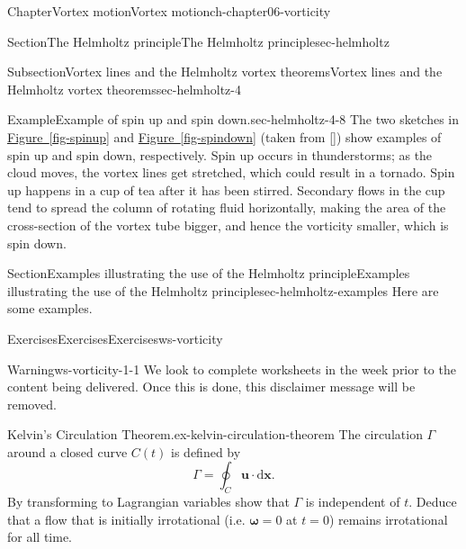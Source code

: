 \documentclass[oneside,10pt,]{book}
\newcommand{\xreffont}{\relax}
\numberwithin{equation}{section}
\newcommand{\de}{\mathrm{d}}
\newcommand{\bomega}{\boldsymbol{\omega}}
\begin{document}
\begin{chapterptx}{Chapter}{Vortex motion}{}{Vortex motion}{}{}{ch-chapter06-vorticity}
\begin{sectionptx}{Section}{The Helmholtz principle}{}{The Helmholtz principle}{}{}{sec-helmholtz}
\begin{subsectionptx}{Subsection}{Vortex lines and the Helmholtz vortex theorems}{}{Vortex lines and the Helmholtz vortex theorems}{}{}{sec-helmholtz-4}
\begin{example}{Example}{Example of spin up and spin down.}{sec-helmholtz-4-8}
The two sketches in \hyperref[fig-spinup]{Figure~{\xreffont\ref{fig-spinup}}} and \hyperref[fig-spindown]{Figure~{\xreffont\ref{fig-spindown}}} (taken from \hyperlink{ref-acheson}{[{\xreffont 4}]}) show examples of spin up and spin down, respectively. Spin up occurs in thunderstorms; as the cloud moves, the vortex lines get stretched, which could result in a tornado. Spin up happens in a cup of tea after it has been stirred. Secondary flows in the cup tend to spread the column of rotating fluid horizontally, making the area of the cross-section of the vortex tube bigger, and hence the vorticity smaller, which is spin down.%
\end{example}
\end{subsectionptx}
\end{sectionptx}
%
%
\typeout{************************************************}
\typeout{************************************************}
%
\begin{sectionptx}{Section}{Examples illustrating the use of the Helmholtz principle}{}{Examples illustrating the use of the Helmholtz principle}{}{}{sec-helmholtz-examples}
Here are some examples.%
\end{sectionptx}
%
%
\typeout{************************************************}
\typeout{************************************************}
%
\begin{exercises-section}{Exercises}{Exercises}{}{Exercises}{}{}{ws-vorticity}
\begin{introduction}{}%
\begin{warning}{Warning}{}{ws-vorticity-1-1}%
We look to complete worksheets in the week prior to the content being delivered. Once this is done, this disclaimer message will be removed.%
\end{warning}
\end{introduction}%
\begin{divisionexercise}{1}{Kelvin’s Circulation Theorem.}{}{ex-kelvin-circulation-theorem}%
The circulation \(\Gamma\) around a closed curve \(C(t)\) is defined by%
\begin{equation*}
\Gamma = \oint_{C} \mathbf{u} \cdot \de\mathbf{x}.
\end{equation*}
By transforming to Lagrangian variables show that \(\Gamma\) is independent of \(t\). Deduce that a flow that is initially irrotational (i.e. \(\bomega = 0\) at \(t=0\)) remains irrotational for all time.%
\par

\end{divisionexercise}
\end{exercises-section}
\end{chapterptx}
\end{document}
